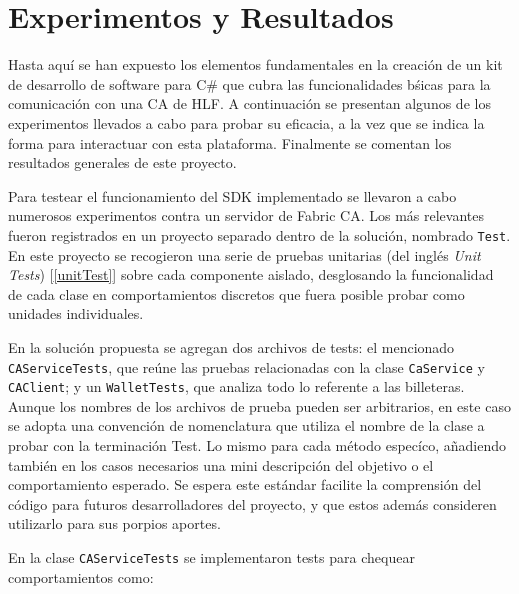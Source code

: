 \chapter{Experimentos y Resultados}\label{chapter:implementation}
Hasta aqu\'i se han expuesto los elementos fundamentales en la creaci\'on de un kit de desarrollo de software para C\# que cubra las funcionalidades b\'sicas para la comunicaci\'on con una CA de HLF. A continuaci\'on se presentan algunos de los experimentos llevados a cabo para probar su eficacia, a la vez que se indica la forma para interactuar con esta plataforma. Finalmente se comentan los resultados generales de este proyecto.

Para testear el funcionamiento del SDK implementado se llevaron a cabo numerosos experimentos contra un servidor de Fabric CA. Los m\'as relevantes fueron registrados en un proyecto separado dentro de la soluci\'on, nombrado \texttt{Test}. En este proyecto se recogieron una serie de pruebas unitarias (del ingl\'es \emph{Unit Tests}) [\ref{unitTest}] sobre cada componente aislado, desglosando la funcionalidad de cada clase en comportamientos discretos que fuera posible probar como unidades individuales.

En la soluci\'on propuesta se agregan dos archivos de tests: el mencionado \texttt{CAServiceTests}, que re\'une las pruebas relacionadas con la clase \texttt{CaService} y \texttt{CAClient}; y un \texttt{WalletTests}, que analiza todo lo referente a las billeteras. Aunque los nombres de los archivos de prueba pueden ser arbitrarios, en este caso se adopta una convención de nomenclatura que utiliza el nombre de la clase a probar con la terminaci\'on Test. Lo mismo para cada m\'etodo espec\'ico, a\~nadiendo tambi\'en en los casos necesarios una mini descripci\'on del objetivo o el comportamiento esperado. Se espera este estándar facilite la comprensi\'on del c\'odigo para futuros desarrolladores del proyecto, y que estos adem\'as consideren utilizarlo para sus porpios aportes.

En la clase \texttt{CAServiceTests} se implementaron tests para chequear comportamientos como: 

